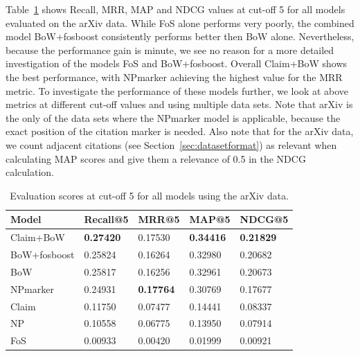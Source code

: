 Table~\ref{tab:arxivevalnumbers} shows Recall, MRR, MAP and NDCG values at cut-off 5 for all models evaluated on the arXiv data. While FoS alone performs very poorly, the combined model BoW+fosboost consistently performs better then BoW alone. Nevertheless, because the performance gain is minute, we see no reason for a more detailed investigation of the models FoS and BoW+fosboost. Overall Claim+BoW shows the best performance, with NPmarker achieving the highest value for the MRR metric. To investigate the performance of these models further, we look at above metrics at different cut-off values and using multiple data sets. Note that arXiv is the only of the data sets where the NPmarker model is applicable, because the exact position of the citation marker is needed. Also note that for the arXiv data, we count adjacent citations (see Section~\ref{sec:datasetformat}) as relevant when calculating MAP scores and give them a relevance of 0.5 in the NDCG calculation.




\begin{table}[]
\centering
    \caption{Evaluation scores at cut-off 5 for all models using the arXiv data.}
    \label{tab:arxivevalnumbers}
\begin{center}
    \begin{tabular}{lllll}
    \toprule
    Model & Recall@5 & MRR@5 & MAP@5 & NDCG@5 \\
    \midrule
    Claim+BoW & \textbf{0.27420} & 0.17530 & \textbf{0.34416} & \textbf{0.21829} \\
    BoW+fosboost  & 0.25824 & 0.16264 & 0.32980 & 0.20682 \\
    BoW       & 0.25817 & 0.16256 & 0.32961 & 0.20673 \\
    NPmarker  & 0.24931 & \textbf{0.17764} & 0.30769 & 0.17677 \\
    Claim     & 0.11750 & 0.07477 & 0.14441 & 0.08337 \\
    NP        & 0.10558 & 0.06775 & 0.13950 & 0.07914 \\
    FoS       & 0.00933 & 0.00420 & 0.01999 & 0.00921 \\
    \bottomrule
    \end{tabular}
\end{center}
\end{table}

